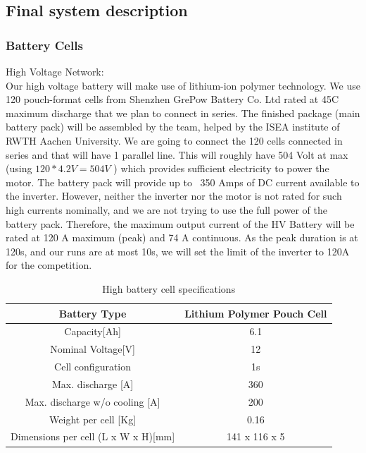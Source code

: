 \subsection{Final system description}
\subsubsection{Battery Cells} 

High Voltage Network: \\
Our high voltage battery will make use of lithium-ion polymer technology. We use 120 pouch-format cells from Shenzhen GrePow Battery Co. Ltd rated at 45C maximum discharge that we plan to connect in series. 
The finished package (main battery pack) will be assembled by the team, helped by the ISEA institute of RWTH Aachen University.
We are going to connect the 120 cells connected in series and that will have 1 parallel line. This will roughly have 504 Volt at max (using \(120 * 4.2V = 504 V \) ) 
which provides sufficient electricity to power the motor.
The battery pack will provide up to ~350 Amps of DC current available to the inverter. However, neither the inverter nor the motor is not rated for such high currents nominally, and we are not trying to use the full power of the battery pack.
\newline
Therefore, the maximum output current of the HV Battery will be rated at 120 A maximum (peak) and 74 A continuous. As the peak duration is at 120s, and our runs are at most 10s, we will set the limit of the inverter to 120A for the competition.

\begin{table}[h]
    \centering
    \begin{tabular}{|c|c|}
       \hline
       Battery Type & Lithium Polymer Pouch Cell\\
       \hline
       Capacity[Ah] & 6.1 \\
       \hline
       Nominal Voltage[V] & 12 \\
       \hline
       Cell configuration & 1s \\
       \hline
       Max. discharge [A] & 360 \\
       \hline
       Max. discharge w/o cooling [A] & 200 \\
       Weight per cell [Kg] & 0.16 \\
       \hline 
       Dimensions per cell (L x W x H)[mm] & 141 x 116 x 5 \\
       \hline 
    \end{tabular}
    \label{High Voltage Cell Specs}
    \caption{High battery cell specifications}
\end{table}    

